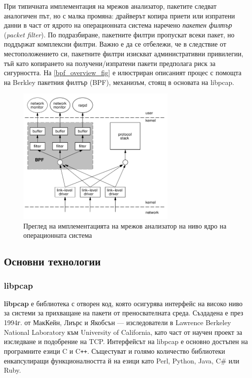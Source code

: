 \documentclass[12pt,a4paper,oneside]{book}
\begin{document}
При типичната имплементация на мрежов анализатор, пакетите следват аналогичен
път, но с малка промяна: драйверът копира приети или изпратени данни в част от
ядрото на операционната система наречено \textit{пакетен филтър}
(\textit{packet filter}). По подразбиране,
пакетните филтри пропускат всеки пакет, но поддържат комплексни филтри.
Важно е да се отбележи, че в следствие от местоположението си, пакетните филтри
изискват административни привилегии, тъй като копирането на получени/изпратени
пакети предполага риск за сигурността. На \autoref{bpf_overview_fig} е
илюстриран описаният процес с помощта на Berkley пакетния филтър (BPF),
механизъм, стоящ в основата на libpcap.

\begin{figure}[h!]
  \centering
  \includegraphics[width=0.7\textwidth]{figures/bpf_overview.png}
  \caption{Преглед на имплементацията на мрежов анализатор на ниво ядро на
  операционната система}
  \label{bpf_overview_fig}
\end{figure}

\subsection{Основни технологии}

\subsubsection{libpcap}

\textbf{libpcap} е библиотека с отворен код, която осигурява интерфейс на високо
ниво за системи за прихващане на пакети от преносвателната среда. Създадена е
през 1994г. от МакКейн, Лиърс и Якобсън --- изследователи в Lawrence Berkeley
National Laboratory към University of California, като част от научен проект за
изследване и подобрение на TCP.  Интерфейсът на libpcap е основно достъпен на
програмните езици C и C\texttt{++}.  Същестуват и голямо количество библиотеки
енкапсулиращи функционалността й на езици като Perl, Python, Java, C# или Ruby.
\end{document}
